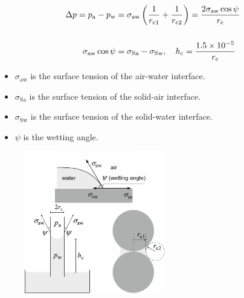 \begin{frame}
	\frametitle{\secname}
	\begin{minipage}{0.5\textwidth}
		\begin{align*}
			\Delta p=p_{\mathrm{a}}-p_{\mathrm{w}} & =
			\sigma_{\mathrm{aw}}\left(\frac{1}{r_{\mathrm{c} 1}}+\frac{1}{r_{\mathrm{c} 2}}\right)
			=\frac{2 \sigma_{\mathrm{aw}} \cos \psi}{r_{\mathrm{c}}}                                  \\[\baselineskip]
			\sigma_{\mathrm{aw}}\cos\psi           & =\sigma_{\mathrm{Sa}}-\sigma_{\mathrm{Sw}},\quad
			h_{\mathrm{c}} =\frac{1.5 \times 10^{-5}}{r_{\mathrm{c}}}
		\end{align*}
		\begin{itemize}
			\item $\sigma_{\mathrm{aw}}$ is the surface tension of the air-water interface.
			\item $\sigma_{\mathrm{Sa}}$ is the surface tension of the solid-air interface.
			\item $\sigma_{\mathrm{Sw}}$ is the surface tension of the solid-water interface.
			\item $\psi$ is the wetting angle.
		\end{itemize}
	\end{minipage}
	\begin{minipage}{0.47\textwidth}
		\begin{figure}[ht!]
			\centering
			\includegraphics[height=6.2cm]{capillar_preassure}
		\end{figure}
	\end{minipage}
\end{frame}


